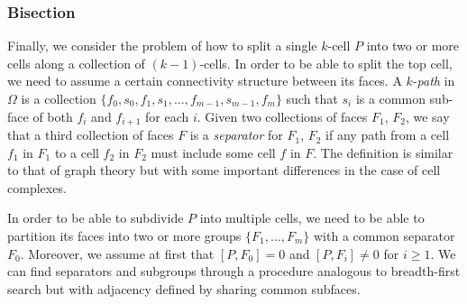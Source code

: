 \documentclass[twocolumn]{article}
\begin{document}
\subsubsection{Bisection}

Finally, we consider the problem of how to split a single $k$-cell $P$ into two or more cells along a collection of $(k - 1)$-cells.
In order to be able to split the top cell, we need to assume a certain connectivity structure between its faces.
A $k$-\emph{path} in $\Omega$ is a collection $\{f_0, s_0, f_1, s_1, \ldots, f_{m - 1}, s_{m - 1}, f_m\}$ such that $s_i$ is a common sub-face of both $f_i$ and $f_{i + 1}$ for each $i$.
Given two collections of faces $F_1$, $F_2$, we say that a third collection of faces $F$ is a \emph{separator} for $F_1$, $F_2$ if any path from a cell $f_1$ in $F_1$ to a cell $f_2$ in $F_2$ must include some cell $f$ in $F$.
The definition is similar to that of graph theory but with some important differences in the case of cell complexes.

In order to be able to subdivide $P$ into multiple cells, we need to be able to partition its faces into two or more groups $\{F_1, \ldots, F_m\}$ with a common separator $F_0$.
Moreover, we assume at first that $[P, F_0] = 0$ and $[P, F_i] \neq 0$ for $i \ge 1$.
We can find separators and subgroups through a procedure analogous to breadth-first search but with adjacency defined by sharing common subfaces.
\end{document}

